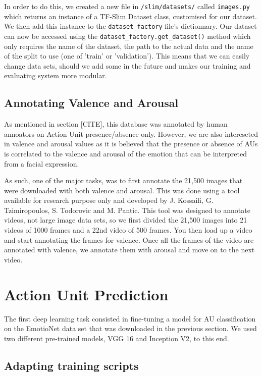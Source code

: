 \documentclass[12pt,twoside]{article}
\begin{document}
In order to do this, we created a new file in \texttt{/slim/datasets/} called \texttt{images.py} 
which returns an instance of a TF-Slim Dataset class, customised for our dataset. 
We then add this instance to the \texttt{dataset\_factory} file's dictionnary.
Our dataset can now be accessed using the
\texttt{dataset\_factory.get\_dataset()} method which only requires the name of
the dataset, the path to the actual data and the name of the split to use (one
of 'train' or 'validation'). This means that we can easily change data sets,
should we add some in the future and makes our training and evaluating system
more modular.

\subsection{Annotating Valence and Arousal}

As mentioned in section [CITE], this database was annotated by human annoators
on Action Unit presence/absence only. However, we are also intereseted in
valence and arousal values as it is believed that the presence or absence of
AUs is correlated to the valence and arousal of the emotion that can be
interpreted from a facial expression.

As such, one of the major tasks, was to first annotate the 21,500 images that
were downloaded with both valence and arousal. This was done using a tool
available for research purpose only and developed by J. Kossaifi, 
G. Tzimiropoulos, S. Todorovic and M. Pantic. This tool was designed to
annotate videos, not large image data sets, so we first divided the 21,500
images into 21 videos of 1000 frames and a 22nd video of 500 frames. You then
load up a video and start annotating the frames for valence. Once all the
frames of the video are annotated with valence, we annotate them with arousal
and move on to the next video.

\section{Action Unit Prediction}

The first deep learning task consisted in fine-tuning a model for AU
classification on the EmotioNet data set that was downloaded in the previous
section. We used two different pre-trained models, VGG 16 and Inception V2, to
this end.

\subsection{Adapting training scripts}
\end{document}
